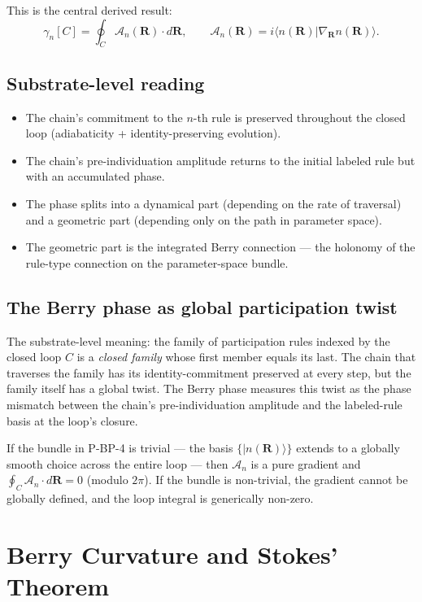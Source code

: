 \documentclass[11pt,a4paper]{article}
\begin{document}
This is the central derived result:
\[
\gamma_n[C] = \oint_C \mathcal{A}_n(\mathbf{R}) \cdot d\mathbf{R}, \qquad \mathcal{A}_n(\mathbf{R}) = i \langle n(\mathbf{R})|\nabla_\mathbf{R} n(\mathbf{R})\rangle.
\]

\subsection{Substrate-level reading}

\begin{itemize}[noitemsep]
  \item The chain's commitment to the $n$-th rule is preserved throughout the closed loop (adiabaticity + identity-preserving evolution).
  \item The chain's pre-individuation amplitude returns to the initial labeled rule but with an accumulated phase.
  \item The phase splits into a dynamical part (depending on the rate of traversal) and a geometric part (depending only on the path in parameter space).
  \item The geometric part is the integrated Berry connection --- the holonomy of the rule-type connection on the parameter-space bundle.
\end{itemize}

\subsection{The Berry phase as global participation twist}

The substrate-level meaning: the family of participation rules indexed by the closed loop $C$ is a \emph{closed family} whose first member equals its last. The chain that traverses the family has its identity-commitment preserved at every step, but the family itself has a global twist. The Berry phase measures this twist as the phase mismatch between the chain's pre-individuation amplitude and the labeled-rule basis at the loop's closure.

If the bundle in P-BP-4 is trivial --- the basis $\{|n(\mathbf{R})\rangle\}$ extends to a globally smooth choice across the entire loop --- then $\mathcal{A}_n$ is a pure gradient and $\oint_C \mathcal{A}_n\cdot d\mathbf{R} = 0$ (modulo $2\pi$). If the bundle is non-trivial, the gradient cannot be globally defined, and the loop integral is generically non-zero.

\section{Berry Curvature and Stokes' Theorem}
\end{document}
